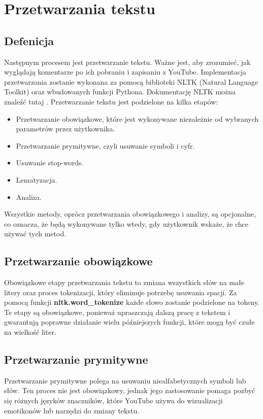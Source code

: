 \section{Przetwarzania tekstu}

	\subsection{Defenicja}
		Następnym procesem jest przetwarzanie tekstu. Ważne jest, aby zrozumieć, jak wyglądają komentarze po ich pobraniu i zapisaniu z YouTube. Implementacja przetwarzania zostanie wykonana za pomocą biblioteki NLTK (Natural Language Toolkit) oraz wbudowanych funkcji Pythona. Dokumentację NLTK można znaleźć tutaj \cite{nltk}. Przetwarzanie tekstu jest podzielone na kilka etapów:
		\begin{itemize}
			\item Przetwarzanie obowiązkowe, które jest wykonywane niezależnie od wybranych parametrów przez użytkownika.
			\item Przetwarzanie prymitywne, czyli usuwanie symboli i cyfr.
			\item Usuwanie stop-words.
			\item Lematyzacja.
			\item Analiza.
		\end{itemize}
		Wszystkie metody, oprócz przetwarzania obowiązkowego i analizy, są opcjonalne, co oznacza, że będą wykonywane tylko wtedy, gdy użytkownik wskaże, że chce używać tych metod.
		
	\subsection{Przetwarzanie obowiązkowe}
		Obowiązkowe etapy przetwarzania tekstu to zmiana wszystkich słów na małe litery oraz proces tokenizacji, który eliminuje potrzebę usuwania spacji. Za pomocą funkcji \textbf{nltk.word\_tokenize} każde słowo zostanie podzielone na tokeny. Te etapy są obowiązkowe, ponieważ upraszczają dalszą pracę z tekstem i gwarantują poprawne działanie wielu późniejszych funkcji, które mogą być czułe na wielkość liter.
	
		
	\subsection{Przetwarzanie prymitywne}
		Przetwarzanie prymitywne polega na usuwaniu niealfabetycznych symboli lub słów. Ten proces nie jest obowiązkowy, jednak jego zastosowanie pomaga pozbyć się różnych języków znaczników, które YouTube używa do wizualizacji emotikonów lub narzędzi do zmiany tekstu.

